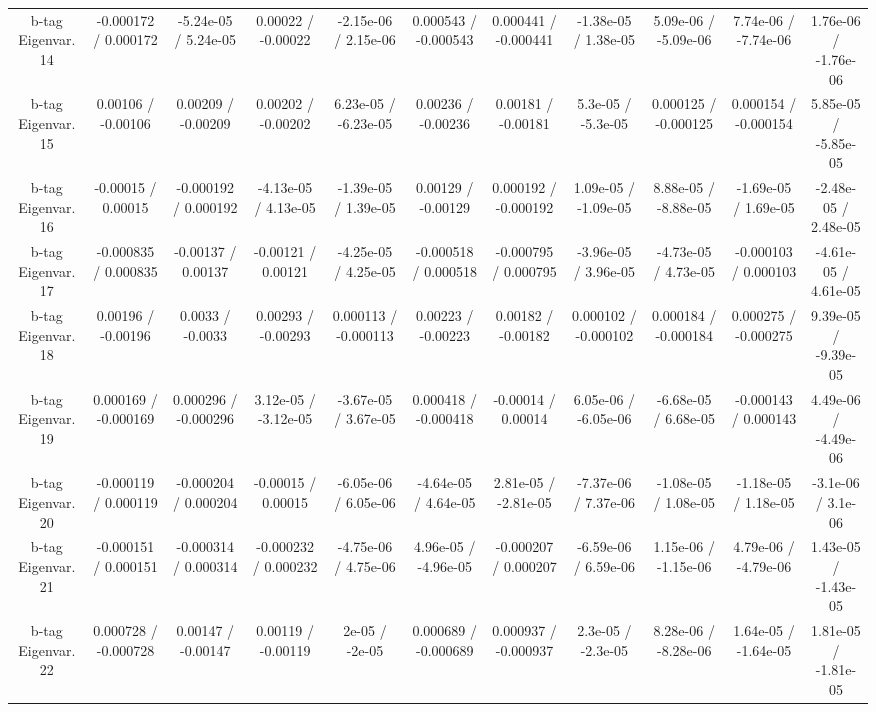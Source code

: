 \begin{table}[htbp]
\begin{center}
\begin{tabular}{|c|c|c|c|c|c|c|c|c|c|c|}
  b-tag Eigenvar. 14 & -0.000172 / 0.000172 & -5.24e-05 / 5.24e-05 & 0.00022 / -0.00022 & -2.15e-06 / 2.15e-06 & 0.000543 / -0.000543 & 0.000441 / -0.000441 & -1.38e-05 / 1.38e-05 & 5.09e-06 / -5.09e-06 & 7.74e-06 / -7.74e-06 & 1.76e-06 / -1.76e-06 \\ 
  b-tag Eigenvar. 15 & 0.00106 / -0.00106 & 0.00209 / -0.00209 & 0.00202 / -0.00202 & 6.23e-05 / -6.23e-05 & 0.00236 / -0.00236 & 0.00181 / -0.00181 & 5.3e-05 / -5.3e-05 & 0.000125 / -0.000125 & 0.000154 / -0.000154 & 5.85e-05 / -5.85e-05 \\ 
  b-tag Eigenvar. 16 & -0.00015 / 0.00015 & -0.000192 / 0.000192 & -4.13e-05 / 4.13e-05 & -1.39e-05 / 1.39e-05 & 0.00129 / -0.00129 & 0.000192 / -0.000192 & 1.09e-05 / -1.09e-05 & 8.88e-05 / -8.88e-05 & -1.69e-05 / 1.69e-05 & -2.48e-05 / 2.48e-05 \\ 
  b-tag Eigenvar. 17 & -0.000835 / 0.000835 & -0.00137 / 0.00137 & -0.00121 / 0.00121 & -4.25e-05 / 4.25e-05 & -0.000518 / 0.000518 & -0.000795 / 0.000795 & -3.96e-05 / 3.96e-05 & -4.73e-05 / 4.73e-05 & -0.000103 / 0.000103 & -4.61e-05 / 4.61e-05 \\ 
  b-tag Eigenvar. 18 & 0.00196 / -0.00196 & 0.0033 / -0.0033 & 0.00293 / -0.00293 & 0.000113 / -0.000113 & 0.00223 / -0.00223 & 0.00182 / -0.00182 & 0.000102 / -0.000102 & 0.000184 / -0.000184 & 0.000275 / -0.000275 & 9.39e-05 / -9.39e-05 \\ 
  b-tag Eigenvar. 19 & 0.000169 / -0.000169 & 0.000296 / -0.000296 & 3.12e-05 / -3.12e-05 & -3.67e-05 / 3.67e-05 & 0.000418 / -0.000418 & -0.00014 / 0.00014 & 6.05e-06 / -6.05e-06 & -6.68e-05 / 6.68e-05 & -0.000143 / 0.000143 & 4.49e-06 / -4.49e-06 \\ 
  b-tag Eigenvar. 20 & -0.000119 / 0.000119 & -0.000204 / 0.000204 & -0.00015 / 0.00015 & -6.05e-06 / 6.05e-06 & -4.64e-05 / 4.64e-05 & 2.81e-05 / -2.81e-05 & -7.37e-06 / 7.37e-06 & -1.08e-05 / 1.08e-05 & -1.18e-05 / 1.18e-05 & -3.1e-06 / 3.1e-06 \\ 
  b-tag Eigenvar. 21 & -0.000151 / 0.000151 & -0.000314 / 0.000314 & -0.000232 / 0.000232 & -4.75e-06 / 4.75e-06 & 4.96e-05 / -4.96e-05 & -0.000207 / 0.000207 & -6.59e-06 / 6.59e-06 & 1.15e-06 / -1.15e-06 & 4.79e-06 / -4.79e-06 & 1.43e-05 / -1.43e-05 \\ 
  b-tag Eigenvar. 22 & 0.000728 / -0.000728 & 0.00147 / -0.00147 & 0.00119 / -0.00119 & 2e-05 / -2e-05 & 0.000689 / -0.000689 & 0.000937 / -0.000937 & 2.3e-05 / -2.3e-05 & 8.28e-06 / -8.28e-06 & 1.64e-05 / -1.64e-05 & 1.81e-05 / -1.81e-05 \\ 

\end{tabular}
\end{center}
\end{table}
